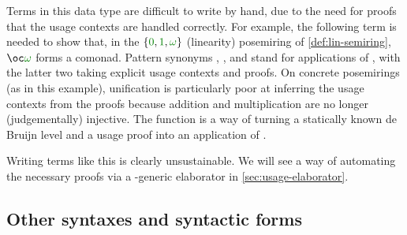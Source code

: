 Terms in this data type are difficult to write by hand, due to the
need for proofs that the usage contexts are handled correctly. For
example, the following term is needed to show that, in the $\{\gr0,
\gr1, \gr\omega\}$ (linearity) posemiring of \cref{def:lin-semiring},
$\oc\gr\omega$ forms a comonad.
Pattern synonyms ,
, and
 stand for applications of
, with the latter two taking explicit usage
contexts and proofs.
On concrete
posemirings (as in this example), unification is particularly poor at
inferring the usage contexts from the proofs because addition and
multiplication are no longer (judgementally) injective.
The function  is a way of turning a statically known de
Bruijn level and a usage proof into an application of .


 Writing terms like this
is clearly unsustainable. We will see a way of automating the
necessary proofs via a -generic elaborator in
\cref{sec:usage-elaborator}.







\subsection{Other syntaxes and syntactic forms}\label{sec:other-syntaxes}

